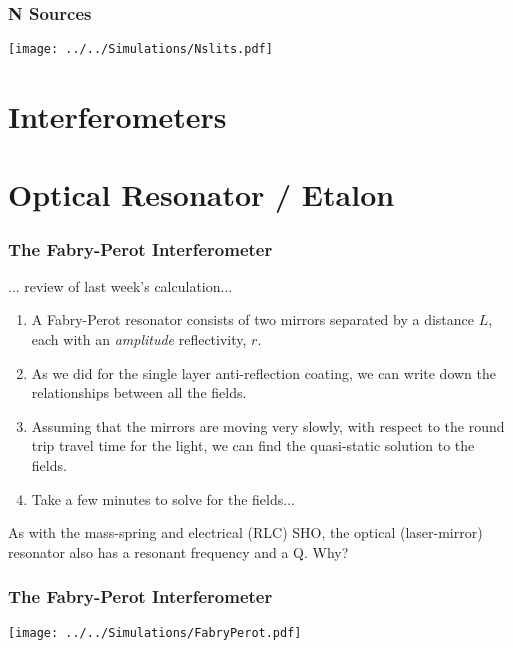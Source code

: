 \documentclass[pdf, handout, hideothersubsections]{beamer}
\begin{document}
\begin{frame}
\frametitle{N Sources}

\centering
\texttt{[image: ../../Simulations/Nslits.pdf]}


\end{frame}


\section{Interferometers}

\section{Optical Resonator / Etalon}
\begin{frame}
\frametitle{The Fabry-Perot Interferometer}
... review of last week's calculation...
\begin{enumerate}
\item A Fabry-Perot resonator consists of two mirrors separated by a
  distance $L$, each with an \emph{amplitude} reflectivity, $r$.

\item As we did for the single layer anti-reflection coating, we can
  write down the relationships between all the fields.

\item Assuming that the mirrors are moving very slowly, with respect
  to the round trip travel time for the light, we can find the
  quasi-static solution to the fields.

\item Take a few minutes to solve for the fields...
\end{enumerate}

As with the mass-spring and electrical (RLC) SHO, the optical
(laser-mirror) resonator also has a resonant frequency and a Q. Why?
\end{frame}


\begin{frame}
\frametitle{The Fabry-Perot Interferometer}

\centering
\texttt{[image: ../../Simulations/FabryPerot.pdf]}

\end{frame}
\end{document}
